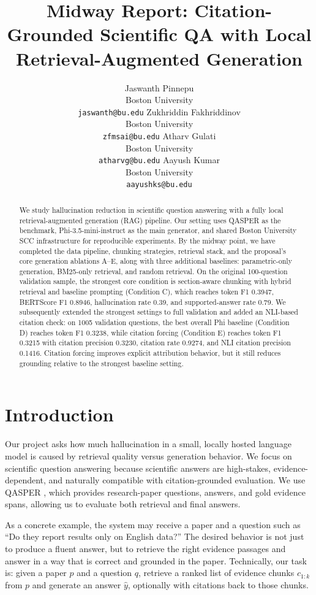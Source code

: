 \documentclass[11pt]{article}
\title{Midway Report: Citation-Grounded Scientific QA with Local Retrieval-Augmented Generation}
\author{
  Jaswanth Pinnepu \\
  Boston University \\
  \texttt{jaswanth@bu.edu}
  \And
  Zukhriddin Fakhriddinov \\
  Boston University \\
  \texttt{zfmsai@bu.edu}
  \And
  Atharv Gulati \\
  Boston University \\
  \texttt{atharvg@bu.edu}
  \And
  Aayush Kumar \\
  Boston University \\
  \texttt{aayushks@bu.edu}
}
\begin{document}
\maketitle

\begin{abstract}
We study hallucination reduction in scientific question answering with a fully local retrieval-augmented generation (RAG) pipeline. Our setting uses QASPER as the benchmark, Phi-3.5-mini-instruct as the main generator, and shared Boston University SCC infrastructure for reproducible experiments. By the midway point, we have completed the data pipeline, chunking strategies, retrieval stack, and the proposal's core generation ablations A--E, along with three additional baselines: parametric-only generation, BM25-only retrieval, and random retrieval. On the original 100-question validation sample, the strongest core condition is section-aware chunking with hybrid retrieval and baseline prompting (Condition C), which reaches token F1 0.3947, BERTScore F1 0.8946, hallucination rate 0.39, and supported-answer rate 0.79. We subsequently extended the strongest settings to full validation and added an NLI-based citation check: on 1005 validation questions, the best overall Phi baseline (Condition D) reaches token F1 0.3238, while citation forcing (Condition E) reaches token F1 0.3215 with citation precision 0.3230, citation rate 0.9274, and NLI citation precision 0.1416. Citation forcing improves explicit attribution behavior, but it still reduces grounding relative to the strongest baseline setting.
\end{abstract}

\section{Introduction}

Our project asks how much hallucination in a small, locally hosted language model is caused by retrieval quality versus generation behavior. We focus on scientific question answering because scientific answers are high-stakes, evidence-dependent, and naturally compatible with citation-grounded evaluation. We use QASPER \citep{dasigi2021qasper}, which provides research-paper questions, answers, and gold evidence spans, allowing us to evaluate both retrieval and final answers.

As a concrete example, the system may receive a paper and a question such as ``Do they report results only on English data?'' The desired behavior is not just to produce a fluent answer, but to retrieve the right evidence passages and answer in a way that is correct and grounded in the paper. Technically, our task is: given a paper $p$ and a question $q$, retrieve a ranked list of evidence chunks $c_{1:k}$ from $p$ and generate an answer $\hat{y}$, optionally with citations back to those chunks.
\end{document}
